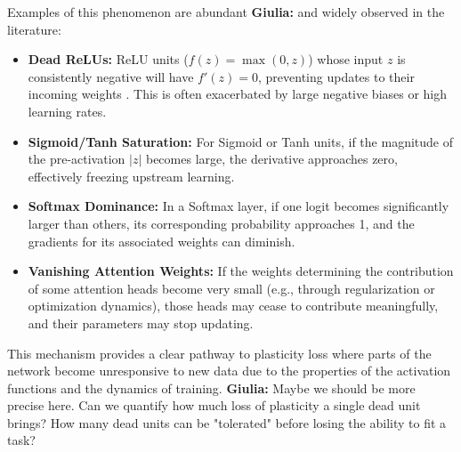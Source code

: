 \documentclass{article}
\newcommand{\giulia}[1]{{\color{ForestGreen}\textbf{Giulia:} #1}}
\begin{document}
Examples of this phenomenon are abundant \giulia{and widely observed in the literature}:
\begin{itemize}
    \item \textbf{Dead ReLUs:} ReLU units ($f(z) = \max(0, z)$) whose input $z$ is consistently negative will have $f'(z)=0$, preventing updates to their incoming weights \cite{nair2010rectified}. This is often exacerbated by large negative biases or high learning rates.
    \item \textbf{Sigmoid/Tanh Saturation:} For Sigmoid or Tanh units, if the magnitude of the pre-activation $|z|$ becomes large, the derivative approaches zero, effectively freezing upstream learning.
    \item \textbf{Softmax Dominance:} In a Softmax layer, if one logit becomes significantly larger than others, its corresponding probability approaches 1, and the gradients for its associated weights can diminish.
    \item \textbf{Vanishing Attention Weights:} If the weights determining the contribution of some attention heads become very small (e.g., through regularization or optimization dynamics), those heads may cease to contribute meaningfully, and their parameters may stop updating.
\end{itemize}
This mechanism provides a clear pathway to plasticity loss where parts of the network become unresponsive to new data due to the properties of the activation functions and the dynamics of training. \giulia{Maybe we should be more precise here. Can we quantify how much loss of plasticity a single dead unit brings? How many dead units can be "tolerated" before losing the ability to fit a task?}
\end{document}
